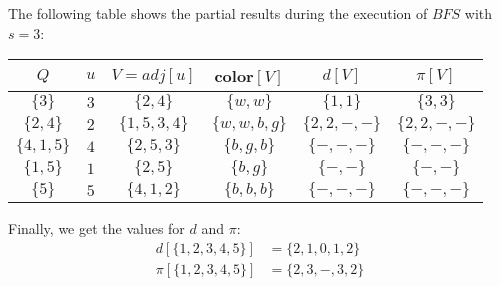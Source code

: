 \documentclass{article}
\begin{document}
\begin{enumerate}[1.]
\begin{center}
    \end{center}
    
    The following table shows the partial results during the execution of $BFS$ with $s = 3$:
	\begin{table}[ht]
		\centering
		\begin{tabular}{cccccc}
			\toprule
			$Q$ & $u$ & $V = adj[u]$ & color$[V]$ & $d[V]$ & $\pi[V]$ \\
			\midrule
            $\{3\}$ & $3$ & $\{2,4\}$ & $\{w,w\}$ & $\{1,1\}$ & $\{3,3\}$ \\
            $\{2,4\}$ & $2$ & $\{1,5,3,4\}$ & $\{w,w,b,g\}$ & $\{2,2,-,-\}$ & $\{2,2,-,-\}$ \\
            $\{4,1,5\}$ & $4$ & $\{2,5,3\}$ & $\{b,g,b\}$ & $\{-,-,-\}$ & $\{-,-,-\}$ \\
            $\{1,5\}$ & $1$ & $\{2,5\}$ & $\{b,g\}$ & $\{-,-\}$ & $\{-,-\}$ \\
            $\{5\}$ & $5$ & $\{4,1,2\}$ & $\{b,b,b\}$ & $\{-,-,-\}$ & $\{-,-,-\}$ \\
			\bottomrule
		\end{tabular}
    \end{table}
    
    Finally, we get the values for $d$ and $\pi$:
    \begin{align*}
        d[\{1,2,3,4,5\}] &= \{2,1,0,1,2\} \\
        \pi[\{1,2,3,4,5\}] &= \{2,3,-,3,2\}
    \end{align*}
    

\end{enumerate}
\end{document}
